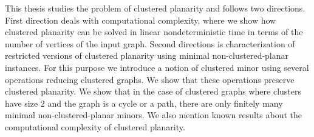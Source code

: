 \documentclass[12pt,a4report]{report}
\begin{document}
\author{Filip Šedivý}

This thesis studies the problem of clustered planarity and follows two directions. First direction deals with computational complexity, where we show how clustered planarity can be solved in linear nondeterministic time in terms of the number of vertices of the input graph. Second directions is characterization of restricted versions of clustered planarity using minimal non-clustered-planar instances.  For this purpose we introduce a notion of clustered minor using several operations reducing clustered graphs. We show that these operations  preserve clustered planarity. We show that in the case of clustered graphs where clusters have size 2 and the graph is a cycle or a path, there are only finitely many minimal non-clustered-planar minors. We also mention known results about the computational complexity of clustered planarity.
\end{document}
